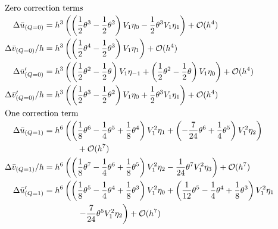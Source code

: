 \begin{align*}
    \intertext{Zero correction terms}
    \Delta \bar{u}_{(Q=0)}    & = h^{3}\left(\left(\frac{1}{2} \theta^{3} - \frac{1}{2} \theta^{2}\right) V_{1} \eta_{0} -\frac{1}{2} \theta^{3} V_{1} \eta_{1}\right) + \mathcal{O}(h^{4})                                                                              \\
    \Delta \bar{v}_{(Q=0)}/h  & = h^{3}\left(\left(\frac{1}{2} \theta^{4} - \frac{1}{2} \theta^{3}\right) V_{1} \eta_{1}\right) + \mathcal{O}(h^{4})                                                                                                                     \\
    \Delta \bar{u}'_{(Q=0)}   & = h^{3}\left(\left(\frac{1}{2} \theta^{2} - \frac{1}{2} \theta\right) V_{1} \eta_{-1} + \left(\frac{1}{2} \theta^{2} - \frac{1}{2} \theta\right) V_{1} \eta_{0}\right) + \mathcal{O}(h^{4})                                              \\
    \Delta \bar{v}'_{(Q=0)}/h & = h^{3}\left(\left(\frac{1}{2} \theta^{3} - \frac{1}{2} \theta^{2}\right) V_{1} \eta_{0} + \frac{1}{2} \theta^{3} V_{1} \eta_{1}\right) + \mathcal{O}(h^{4})                                                                             \\
    \intertext{One correction term}
    \Delta \bar{u}_{(Q=1)}    & = h^{6}\left(\left(\frac{1}{8} \theta^{6} - \frac{1}{4} \theta^{5} + \frac{1}{8} \theta^{4}\right) V_{1}^{2} \eta_{1} + \left(-\frac{7}{24} \theta^{6} + \frac{1}{4} \theta^{5}\right) V_{1}^{2} \eta_{2}\right)                         \\
                              & \qquad\qquad + \mathcal{O}(h^{7})                                                                                                                                                                                                        \\
    \Delta\bar{v}_{(Q=1)}/h   & = h^{6}\left(\left(\frac{1}{8} \theta^{7} - \frac{1}{4} \theta^{6} + \frac{1}{8} \theta^{5}\right) V_{1}^{2} \eta_{2} -\frac{1}{24} \theta^{7} V_{1}^{2} \eta_{3}\right) + \mathcal{O}(h^{7})                                            \\
    \Delta \bar{u}'_{(Q=1)}   & = h^{6}\left(\left(\frac{1}{8} \theta^{5} - \frac{1}{4} \theta^{4} + \frac{1}{8} \theta^{3}\right) V_{1}^{2} \eta_{0} + \left(\frac{1}{12} \theta^{5} - \frac{1}{4} \theta^{4} + \frac{1}{8} \theta^{3}\right) V_{1}^{2} \eta_{1}\right. \\
                              & \qquad\qquad \left. -\frac{7}{24} \theta^{5} V_{1}^{2} \eta_{2}\right) + \mathcal{O}(h^{7})                                                                                                                                              \\

\end{align*}
